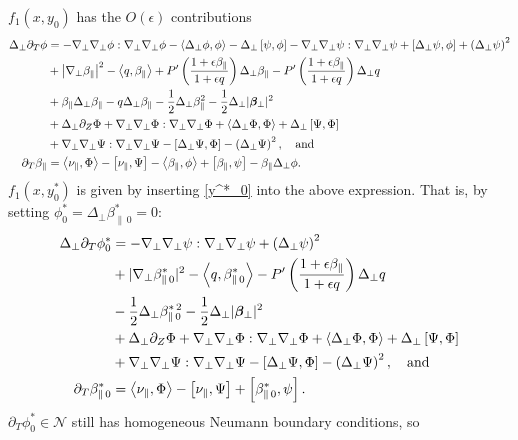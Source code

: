 \documentclass{article}
\newcommand{\para}{\parallel}
\newcommand{\ep}{\epsilon}
\newcommand{\np}{\nabla_\perp}
\newcommand{\lap}{\Delta_\perp}
\newcommand{\p}{\partial}
\newcommand{\frinv}{\frac{1+\ep\beta_\para}{1+\ep q}}
\newcommand{\pth} [1] {\left( #1 \right) }
\newcommand{\br} [1] {\left[ #1 \right] }
\begin{document}
$f_1(x,y_0)$ has the $O(\ep)$ contributions 
\begin{align*}
    \lap \p_T\phi &= - \np\np\phi:\np\np\phi - \Braket{\lap\phi, \phi} - \lap\br{\psi,\phi} - \np\np\psi:\np\np\psi + \br{\lap\psi, \phi} + \pth{\lap\psi}^2 \\
        &+ \left|\np\beta_\para\right|^2 - \Braket{q,\beta_\para} + P'\pth{\frinv} \lap\beta_\para - P'\pth{\frinv} \lap q \\ 
        &+\beta_\para\lap\beta_\para - q\lap\beta_\para - \frac{1}{2}\lap \beta_\para^2 - \frac{1}{2}\lap |\bm{\beta}_\perp|^2 \\ 
        &+ \lap\p_Z\Phi + \np\np\Phi:\np\np\Phi + \Braket{\lap\Phi, \Phi} + \lap\br{\Psi,\Phi} \\ 
        &+ \np\np\Psi:\np\np\Psi - \br{\lap\Psi, \Phi} - \pth{\lap\Psi}^2, \quad\text{and} \\ 
    \p_T\beta_\para &= \Braket{\nu_\para, \Phi} - \br{\nu_\para, \Psi} - \Braket{\beta_\para, \phi} + \br{\beta_\para, \psi} - \beta_\para\lap\phi. 
\end{align*}
$f_1(x,y_0^*)$ is given by inserting \eqref{y^*_0} into the above expression. That is, by setting $\phi^*_0 = \lap\beta_{\para\,0}^* = 0$: 
\begin{align*}
    \lap \p_T\phi_0^* &= - \np\np\psi:\np\np\psi + \pth{\lap\psi}^2 \\ 
        &+ |\np\beta_{\para\,0}^*|^2 - \Braket{q,\beta_{\para\,0}^*} - P'\pth{\frinv} \lap q \\ 
        &- \frac{1}{2}\lap \beta_{\para\,0}^{*\,2} - \frac{1}{2}\lap |\bm{\beta}_\perp|^2 \\ 
        &+ \lap\p_Z\Phi + \np\np\Phi:\np\np\Phi + \Braket{\lap\Phi, \Phi} + \lap\br{\Psi,\Phi} \\ 
        &+ \np\np\Psi:\np\np\Psi - \br{\lap\Psi, \Phi} - \pth{\lap\Psi}^2, \quad \text{and} \\
    \p_T\beta_{\para\,0}^* &= 
    \Braket{\nu_\para, \Phi} - \br{\nu_\para, \Psi} + \br{\beta_{\para\,0}^*, \psi}. 
\end{align*}
$\p_T\phi^*_0\in\mathcal{N}$ still has homogeneous Neumann boundary conditions, so 
\end{document}
